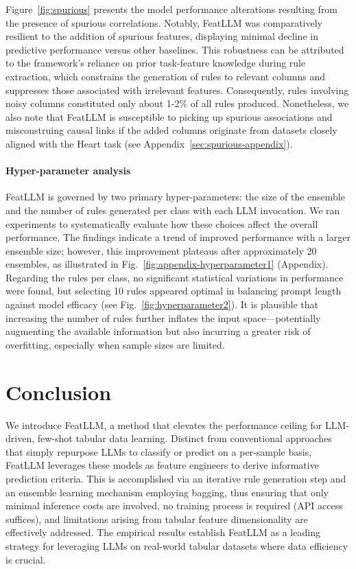 Figure~\ref{fig:spurious} presents the model performance alterations resulting from the presence of spurious correlations. Notably, \textsf{FeatLLM} was comparatively resilient to the addition of spurious features, displaying minimal decline in predictive performance versus other baselines. This robustness can be attributed to the framework’s reliance on prior task-feature knowledge during rule extraction, which constrains the generation of rules to relevant columns and suppresses those associated with irrelevant features. Consequently, rules involving noisy columns constituted only about 1-2\% of all rules produced. Nonetheless, we also note that \textsf{FeatLLM} is susceptible to picking up spurious associations and misconstruing causal links if the added columns originate from datasets closely aligned with the Heart task (see Appendix~\ref{sec:spurious-appendix}).

\vspace*{-0.12in}
\paragraph{Hyper-parameter analysis}
\textsf{FeatLLM} is governed by two primary hyper-parameters: the size of the ensemble and the number of rules generated per class with each LLM invocation. We ran experiments to systematically evaluate how these choices affect the overall performance. The findings indicate a trend of improved performance with a larger ensemble size; however, this improvement plateaus after approximately 20 ensembles, as illustrated in Fig.~\ref{fig:appendix-hyperparameter1} (Appendix). Regarding the rules per class, no significant statistical variations in performance were found, but selecting 10 rules appeared optimal in balancing prompt length against model efficacy (see Fig.~\ref{fig:hyperparameter2}). It is plausible that increasing the number of rules further inflates the input space—potentially augmenting the available information but also incurring a greater risk of overfitting, especially when sample sizes are limited.

\section{Conclusion}
We introduce \textsf{FeatLLM}, a method that elevates the performance ceiling for LLM-driven, few-shot tabular data learning. Distinct from conventional approaches that simply repurpose LLMs to classify or predict on a per-sample basis, \textsf{FeatLLM} leverages these models as feature engineers to derive informative prediction criteria. This is accomplished via an iterative rule generation step and an ensemble learning mechanism employing bagging, thus ensuring that only minimal inference costs are involved, no training process is required (API access suffices), and limitations arising from tabular feature dimensionality are effectively addressed. The empirical results establish \textsf{FeatLLM} as a leading strategy for leveraging LLMs on real-world tabular datasets where data efficiency is crucial.

